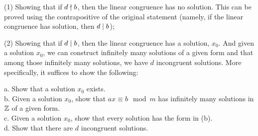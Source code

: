 (1) Showing that if $d \mathrel{\nmid} b$, then the linear congruence has no solution. This can be proved using the contrapositive of the original statement (namely, if the linear congruence has solution, then $d \mathrel{\mid} b$); 

(2) Showing that if $d \mathrel{\mid} b$, then the linear congruence has a solution, $x_0$. And given a solution $x_0$, we can construct infinitely many solutions of a given form and that among those infinitely many solutions, we have $d$ incongruent solutions. More specifically, it suffices to show the following:

\begin{addmargin}[1em]{0em}
    a. Show that a solution $x_0$ exists. \\
    b. Given a solution $x_0$, show that $ax \equiv b \mod m$ has infinitely many solutions in $\mathbb{Z}$ of a given form. \\
    c. Given a solution $x_0$, show that every solution has the form in (b). \\
    d. Show that there are $d$ incongruent solutions.
\end{addmargin}

